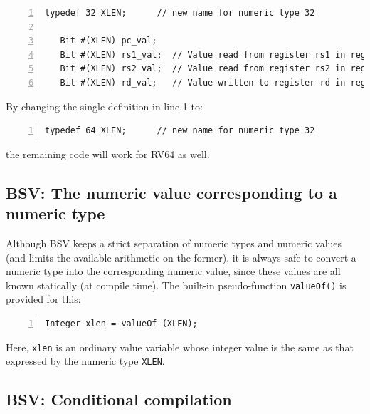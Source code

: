 \begin{Verbatim}[frame=single, numbers=left]
   typedef 32 XLEN;      // new name for numeric type 32

   Bit #(XLEN) pc_val;
   Bit #(XLEN) rs1_val;  // Value read from register rs1 in register file
   Bit #(XLEN) rs2_val;  // Value read from register rs2 in register file
   Bit #(XLEN) rd_val;   // Value written to register rd in register file
\end{Verbatim}

By changing the single definition in line 1 to:
\begin{Verbatim}[frame=single, numbers=left]
   typedef 64 XLEN;      // new name for numeric type 32
\end{Verbatim}
the remaining code will work for RV64 as well.


\subsection{BSV: The numeric value corresponding to a numeric type}

\label{BSV_value_of_numeric_type}


Although BSV keeps a strict separation of numeric types and numeric
values (and limits the available arithmetic on the former), it is
always safe to convert a numeric type into the corresponding numeric
value, since these values are all known statically (at compile time).
The built-in pseudo-function \verb|valueOf()| is provided for this:

\begin{Verbatim}[frame=single, numbers=left]
   Integer xlen = valueOf (XLEN);
\end{Verbatim}

Here, \verb|xlen| is an ordinary value variable whose integer value is
the same as that expressed by the numeric type \verb|XLEN|.


\subsection{BSV: Conditional compilation}

\label{BSV_Conditional_compilation}

